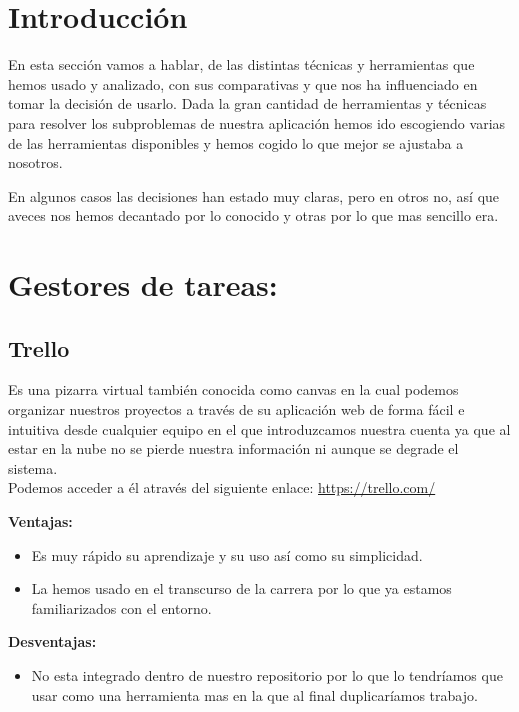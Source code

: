 
\section{Introducción}
En esta sección vamos a hablar, de las distintas técnicas y herramientas que hemos usado y analizado, con sus comparativas y que nos ha influenciado en tomar la decisión de usarlo.
Dada la gran cantidad de herramientas y técnicas para resolver los subproblemas de nuestra aplicación hemos ido escogiendo varias de las herramientas disponibles y hemos cogido lo que mejor se ajustaba a nosotros.

En algunos casos las decisiones han estado muy claras, pero en otros no, así que aveces nos hemos decantado por lo conocido y otras por lo que mas sencillo era.

\section{Gestores de tareas:}
\subsection{Trello}
Es una pizarra virtual también conocida como canvas en la cual podemos organizar nuestros proyectos a través de su aplicación web de forma fácil e intuitiva desde cualquier equipo en el que introduzcamos nuestra cuenta ya que al estar en la nube no se pierde nuestra información ni aunque se degrade el sistema.\\
Podemos acceder a él através del siguiente enlace: 
\url{https://trello.com/}



\textbf{Ventajas:}

\begin{itemize}
\item Es muy rápido su aprendizaje y su uso así como su simplicidad.

\item La hemos usado en el transcurso de la carrera por lo que ya estamos familiarizados con el entorno.
\end{itemize}

\textbf{Desventajas:}

\begin{itemize}
\item No esta integrado dentro de nuestro repositorio por lo que lo tendríamos que usar como una herramienta mas en la que al final duplicaríamos trabajo.
\end{itemize}


